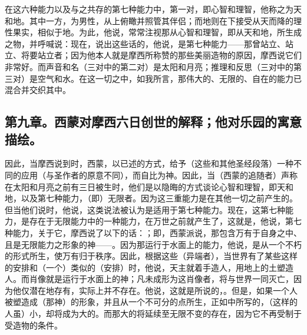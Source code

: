 在这六种能力以及与之共存的第七种能力中，第一对，即心智和理智，他称之为天和地。其中一方，为男性，从上俯瞰并照管其伴侣；而地则在下接受从天而降的理性果实，相似于地。为此，他说，常常注视那从心智和理智，即从天和地，所生成之物，并呼喊说：现在，说出这些话的，他说，是第七种能力——那曾站立、站立、将要站立者；因为他本人就是摩西所称赞的那些美丽造物的原因，摩西说它们非常好。而声音和名（三对中的第二对）是太阳和月亮；推理和反思（三对中的第三对）是空气和水。在这一切之中，如我所言，那伟大的、无限的、自在的能力已混合并交织其中。\par


\subsection{第九章。西蒙对摩西六日创世的解释；他对乐园的寓意描绘。}

因此，当摩西说到时，西蒙，以已述的方式，给予（这些和其他圣经段落）一种不同的应用（与圣作者的原意不同），而自比为神。因此，当（西蒙的追随者）声称在太阳和月亮之前有三日被生时，他们是以隐晦的方式谈论心智和理智，即天和地，以及第七种能力，（即）无限者。因为这三重能力是在其他一切之前产生的。但当他们说时，他说，这类说法被认为是适用于第七种能力。现在，这第七种能力，是存在于无限能力中的一种能力，在万世之前就产生了，这就是，他说，第七种能力，关于它，摩西说了以下的话：；即，西蒙派说，那包含万有于自身之中、且是无限能力之形象的神——。因为那运行于水面上的能力，他说，是从一个不朽的形式所生，使万有归于秩序。因此，根据这些（异端者），当世界有了某些这样的安排和（一个）类似的（安排）时，他说，天主就着手造人，用地上的土塑造人。而肖像就是运行于水面上的神；凡未成形为这肖像者，将与世界一同灭亡，因为他仅潜在地存有，实际上并不存在。他说，这就是所说的，。但是，如果一个人被塑造成（那神）的形象，并且从一个不可分的点所生，正如中所写的，（这样的人虽）小，却将成为大的。而那大的将延续至无限不变的存在，因为它不再受制于受造物的条件。\par

